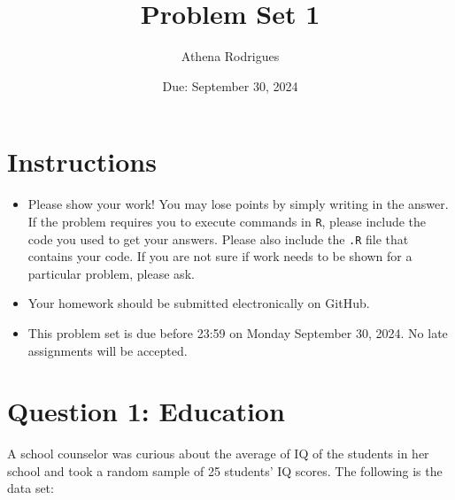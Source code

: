 \documentclass[12pt,letterpaper]{article}
\title{Problem Set 1}
\date{Due: September 30, 2024}
\author{Athena Rodrigues}
\begin{document}
	\maketitle
	
	\section*{Instructions}
	\begin{itemize}
	\item Please show your work! You may lose points by simply writing in the answer. If the problem requires you to execute commands in \texttt{R}, please include the code you used to get your answers. Please also include the \texttt{.R} file that contains your code. If you are not sure if work needs to be shown for a particular problem, please ask.
\item Your homework should be submitted electronically on GitHub.
\item This problem set is due before 23:59 on Monday September 30, 2024. No late assignments will be accepted.
	\end{itemize}
	\section*{Question 1: Education}

A school counselor was curious about the average of IQ of the students in her school and took a random sample of 25 students' IQ scores. The following is the data set:\\
  
\end{document}
